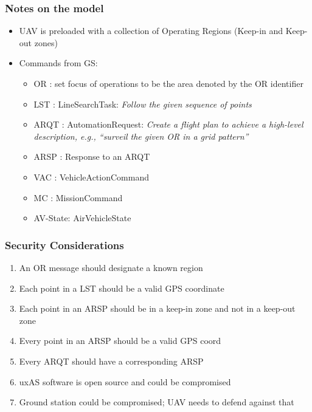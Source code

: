 \documentclass{beamer}
\begin{document}
\begin{frame}\frametitle{Notes on the model}

\begin{itemize}
\item UAV is preloaded with a collection of Operating Regions (Keep-in and Keep-out zones)
\item Commands from GS:
\begin{itemize}
  \item OR : set focus of operations to be the area denoted by the OR identifier
  \item LST : LineSearchTask: \emph{Follow the given sequence of points}
  \item ARQT : AutomationRequest: \emph{Create a flight plan to
    achieve a high-level description, e.g., ``surveil the given OR in
    a grid pattern''}
  \item ARSP : Response to an ARQT
  \item VAC : VehicleActionCommand
  \item MC : MissionCommand
  \item AV-State: AirVehicleState
\end{itemize}
\end{itemize}

\end{frame}

\begin{frame}\frametitle{Security Considerations}

\begin{enumerate}
\item An OR message should designate a known region
\item Each point in a LST should be a valid GPS coordinate
\item Each point in an ARSP should be in a keep-in zone and not in a keep-out zone
\item Every point in an ARSP should be a valid GPS coord
\item Every ARQT should have a corresponding ARSP
\item uxAS software is open source and could be compromised
\item Ground station could be compromised; UAV needs to defend against that
\end{enumerate}

\end{frame}
\end{document}
